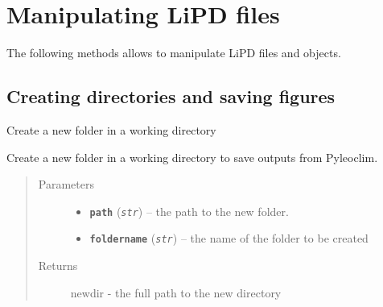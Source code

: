 \documentclass[letterpaper,10pt,english]{sphinxmanual}
\begin{document}
\chapter{Manipulating LiPD files}
\label{LIPDutils::doc}\label{LIPDutils:manipulating-lipd-files}
The following methods allows to manipulate LiPD files and objects.


\section{Creating directories and saving figures}
\label{LIPDutils:creating-directories-and-saving-figures}

\begin{fulllineitems}
\label{LIPDutils:pyleoclim.createDir}
Create a new folder in a working directory

Create a new folder in a working directory to save outputs from Pyleoclim.
\begin{quote}\begin{description}
\item[{Parameters}] \leavevmode\begin{itemize}
\item {} 
\textbf{\texttt{path}} (\emph{\texttt{str}}) -- the path to the new folder.

\item {} 
\textbf{\texttt{foldername}} (\emph{\texttt{str}}) -- the name of the folder to be created

\end{itemize}

\item[{Returns}] \leavevmode
newdir - the full path to the new directory

\end{description}\end{quote}

\end{fulllineitems}

\end{document}
